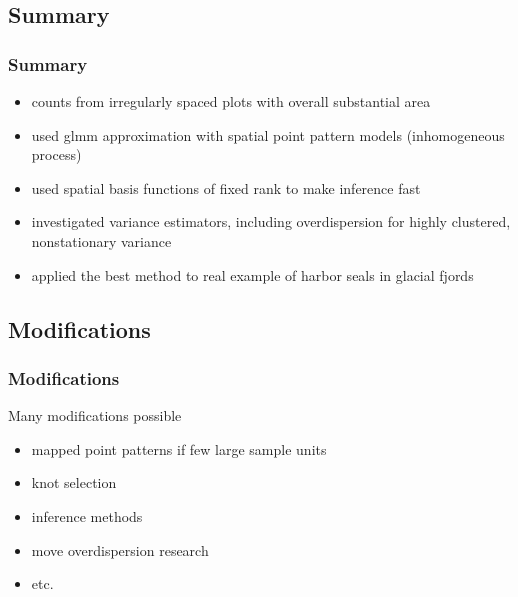 \documentclass[mathserif,compress]{beamer}
\def\bit{\begin{itemize}}
\def\eit{\end{itemize}}
\begin{document}
\subsection{Summary}
\begin{frame} \frametitle{Summary}
     
		\bit
			\item counts from irregularly spaced plots with overall substantial area \pause      
				\vspace{0.2cm}       
			\item used glmm approximation with spatial point pattern models (inhomogeneous process)  \pause         
				\vspace{0.2cm} 
			\item used spatial basis functions of fixed rank to make inference fast \pause    
				\vspace{0.2cm}      
			\item investigated variance estimators, including overdispersion for highly clustered, nonstationary variance \pause 
				\vspace{0.2cm}
			\item applied the best method to real example of harbor seals in glacial fjords
		\eit

\end{frame}


\subsection{Modifications}
\begin{frame} \frametitle{Modifications}
     
Many modifications possible
		\bit
			\item  mapped point patterns if few large sample units \pause      
				\vspace{0.3cm}       
			\item knot selection  \pause         
				\vspace{0.3cm} 
			\item inference methods \pause    
				\vspace{0.3cm}      
			\item move overdispersion research \pause 
				\vspace{0.3cm}
			\item etc.
		\eit

\end{frame}
\end{document}
